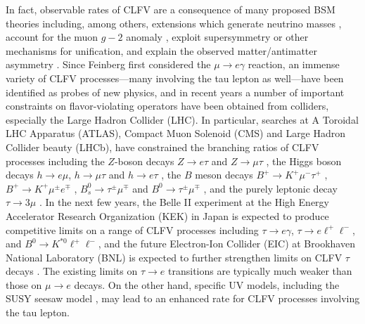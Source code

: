 \documentclass{book}[letterpaper,12pt]
\begin{document}
In fact, observable rates of CLFV are a consequence of many proposed BSM theories including, among others, extensions which generate neutrino masses \cite{PhysRevD.67.076006,Abada:2015oba}, account for the muon $g-2$ anomaly \cite{Lindner:2016bgg,Li:2021lnz}, exploit supersymmetry \cite{Carvalho:2002bq,PhysRevD.74.116002,Figueiredo:2013tea,Gomez:2017dhl} or other mechanisms \cite{Ciafaloni:1995ad,Benbrik:2010cf,Feldmann:2016hvo} for unification, and explain the observed matter/antimatter asymmetry \cite{PhysRevD.83.076007,Merlo:2018rin}. Since Feinberg first considered the $\mu\rightarrow e\gamma$ reaction, an immense variety of CLFV processes---many involving the tau lepton as well---have been identified as probes of new physics, and in recent years a number of important constraints on flavor-violating operators have been obtained from colliders, especially the Large Hadron Collider (LHC). In particular, searches at A Toroidal LHC Apparatus (ATLAS), Compact Muon Solenoid (CMS) and Large Hadron Collider beauty (LHCb), have constrained the branching ratios of CLFV processes including the $Z$-boson decays $Z\rightarrow e\tau$ and $Z\rightarrow \mu\tau$ \cite{ATLAS:2020zlz,ATLAS:2021bdj}, the Higgs boson decays $h\rightarrow e\mu$, $h\rightarrow \mu\tau$ and $h\rightarrow e\tau$ \cite{ATLAS:2016joj,CMS:2017con,CMS:2021rsq}, the $B$ meson decays $B^+\rightarrow K^+\mu^-\tau^+$ \cite{LHCb:2020khb}, $B^+\rightarrow K^+\mu^{\pm}e^{\mp}$ \cite{LHCb:2019bix}, $B_s^{0}\rightarrow \tau^{\pm}\mu^{\mp}$ and $B^0\rightarrow \tau^{\pm}\mu^{\mp}$ \cite{LHCb:2019ujz}, and the purely leptonic decay $\tau\rightarrow 3\mu$ \cite{LHCb:2014kws,ATLAS:2016jts,CMS:2020kwy}. In the next few years, the Belle II experiment \cite{Belle-II:2018jsg} at the High Energy Accelerator Research Organization (KEK) in Japan is expected to produce competitive limits on a range of CLFV processes including $\tau\rightarrow e\gamma$, $\tau\rightarrow e\ell^+\ell^-$, and $B^0\rightarrow K^{*0}\ell^+\ell^-$, and the future Electron-Ion Collider (EIC) \cite{AbdulKhalek:2022erw} at Brookhaven National Laboratory (BNL) is expected to further strengthen limits on CLFV $\tau$ decays \cite{Cirigliano:2021img}. The existing limits on $\tau\rightarrow e$ transitions are typically much weaker than those on $\mu\rightarrow e$ decays. On the other hand, specific UV models, including the SUSY seesaw model \cite{Ellis:1999uq}, may lead to an enhanced rate for CLFV processes involving the tau lepton.
\end{document}
